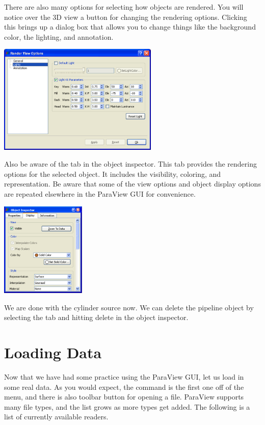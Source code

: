 There are also many options for selecting how objects are rendered.  You
will notice over the 3D view a  button for changing the
rendering options.  Clicking this brings up a dialog box that allows you to
change things like the background color, the lighting, and annotation.

\begin{inlinefig}
  \includegraphics[width=3in]{images/RenderViewOptions}
\end{inlinefig}

Also be aware of the  tab in the object inspector.  This tab
provides the rendering options for the selected object.  It includes the
visibility, coloring, and representation.  Be aware that some of the view
options and object display options are repeated elsewhere in the ParaView
GUI for convenience.

\begin{inlinefig}
  \includegraphics[width=1.6in]{images/DisplayTab}
\end{inlinefig}

We are done with the cylinder source now.  We can delete the pipeline
object by selecting the  tab and hitting delete \delete in
the object inspector.


\section{Loading Data}

Now that we have had some practice using the ParaView GUI, let us load in
some real data.  As you would expect, the  command is the first
one off of the  menu, and there is also toolbar button for
opening a file.  ParaView supports many file types, and the list grows as
more types get added.  The following is a list of currently available
readers.

